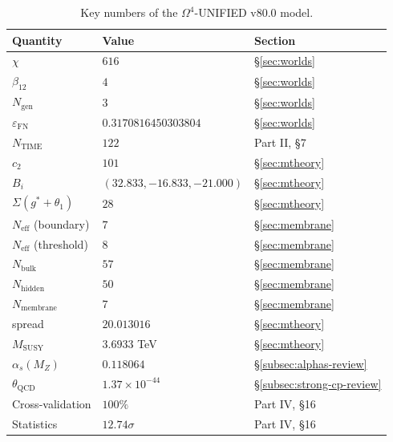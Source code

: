 \documentclass[11pt,a4paper]{article}
\newcommand{\Om}{\Omega^4}
\newcommand{\Ngen}{N_{\text{gen}}}
\newcommand{\Neff}{N_{\text{eff}}}
\newcommand{\Nbulk}{N_{\text{bulk}}}
\newcommand{\Nhidden}{N_{\text{hidden}}}
\newcommand{\Nmembrane}{N_{\text{membrane}}}
\newcommand{\epsFN}{\varepsilon_{\text{FN}}}
\theoremstyle{definition}
\begin{document}
\begin{table}[htbp]
\centering
\caption{Key numbers of the $\Om$-UNIFIED v80.0 model.}
\label{tab:key-numbers}
\begin{tabular}{lll}
\toprule
Quantity & Value & Section \\
\midrule
$\chi$ & $616$ & §\ref{sec:worlds} \\
$\beta_{12}$ & $4$ & §\ref{sec:worlds} \\
$\Ngen$ & $3$ & §\ref{sec:worlds} \\
$\epsFN$ & $0.3170816450303804$ & §\ref{sec:worlds} \\
$N_{\text{TIME}}$ & $122$ & Part II, §7 \\
$c_2$ & $101$ & §\ref{sec:mtheory} \\
$B_i$ & $(32.833, -16.833, -21.000)$ & §\ref{sec:mtheory} \\
$\Sigma(g^*+\theta_1)$ & $28$ & §\ref{sec:mtheory} \\
$\Neff$ (boundary) & $7$ & §\ref{sec:membrane} \\
$\Neff$ (threshold) & $8$ & §\ref{sec:membrane} \\
$\Nbulk$ & $57$ & §\ref{sec:membrane} \\
$\Nhidden$ & $50$ & §\ref{sec:membrane} \\
$\Nmembrane$ & $7$ & §\ref{sec:membrane} \\
spread & $20.013016$ & §\ref{sec:mtheory} \\
$M_{\text{SUSY}}$ & $3.6933$ TeV & §\ref{sec:mtheory} \\
$\alpha_s(M_Z)$ & $0.118064$ & §\ref{subsec:alphas-review} \\
$\theta_{\text{QCD}}$ & $1.37 \times 10^{-44}$ & §\ref{subsec:strong-cp-review} \\
Cross-validation & $100\%$ & Part IV, §16 \\
Statistics & $12.74\sigma$ & Part IV, §16 \\
\bottomrule
\end{tabular}
\end{table}
\end{document}
